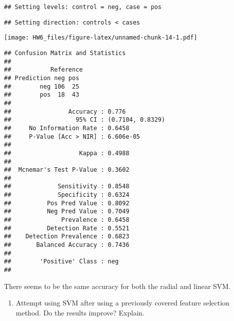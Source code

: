 \documentclass[]{article}
\newenvironment{Shaded}{\begin{snugshade}}{\end{snugshade}}
\newcommand{\DataTypeTok}[1]{\textcolor[rgb]{0.13,0.29,0.53}{#1}}
\newcommand{\KeywordTok}[1]{\textcolor[rgb]{0.13,0.29,0.53}{\textbf{#1}}}
\newcommand{\NormalTok}[1]{#1}
\newcommand{\OperatorTok}[1]{\textcolor[rgb]{0.81,0.36,0.00}{\textbf{#1}}}
\newcommand{\StringTok}[1]{\textcolor[rgb]{0.31,0.60,0.02}{#1}}
\providecommand{\tightlist}{%
  \setlength{\itemsep}{0pt}\setlength{\parskip}{0pt}}
\begin{document}
\begin{verbatim}
## Setting levels: control = neg, case = pos
\end{verbatim}

\begin{verbatim}
## Setting direction: controls < cases
\end{verbatim}

\texttt{[image: HW6\_files/figure-latex/unnamed-chunk-14-1.pdf]}

\begin{Shaded}
\end{Shaded}

\begin{verbatim}
## Confusion Matrix and Statistics
## 
##           Reference
## Prediction neg pos
##        neg 106  25
##        pos  18  43
##                                           
##                Accuracy : 0.776           
##                  95% CI : (0.7104, 0.8329)
##     No Information Rate : 0.6458          
##     P-Value [Acc > NIR] : 6.606e-05       
##                                           
##                   Kappa : 0.4988          
##                                           
##  Mcnemar's Test P-Value : 0.3602          
##                                           
##             Sensitivity : 0.8548          
##             Specificity : 0.6324          
##          Pos Pred Value : 0.8092          
##          Neg Pred Value : 0.7049          
##              Prevalence : 0.6458          
##          Detection Rate : 0.5521          
##    Detection Prevalence : 0.6823          
##       Balanced Accuracy : 0.7436          
##                                           
##        'Positive' Class : neg             
## 
\end{verbatim}

There seems to be the same accuracy for both the radial and linear SVM.

\begin{enumerate}
\def\labelenumi{\arabic{enumi}.}
\setcounter{enumi}{1}
\tightlist
\item
  Attempt using SVM after using a previously covered feature selection
  method. Do the results improve? Explain.
\end{enumerate}
\end{document}

